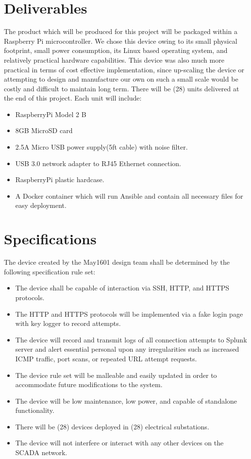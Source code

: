 \section{Deliverables}

The product which will be produced for this project will be packaged within a Raspberry Pi microcontroller. We chose this device owing to its small physical footprint, small power consumption, its Linux based operating system, and relatively practical hardware capabilities. This device was also much more practical in terms of cost effective implementation, since up-scaling the device or attempting to design and manufacture our own on such a small scale would be costly and difficult to maintain long term. There will be (28) units delivered at the end of this project. Each unit will include:

\begin{itemize} 
\item RaspberryPi Model 2 B
\item 8GB MicroSD card
\item 2.5A Micro USB power supply(5ft cable) with noise filter.
\item USB 3.0 network adapter to RJ45 Ethernet connection.
\item RaspberryPi plastic hardcase.
\item A Docker container which will run Ansible and contain all necessary files for easy deployment.
\end{itemize}

\section{Specifications}

The device created by the May1601 design team shall be determined by the following specification rule set:

\begin{itemize} 
\item The device shall be capable of interaction via SSH, HTTP, and HTTPS protocols.
\item The HTTP and HTTPS protocols will be implemented via a fake login page with key logger to record attempts.
\item The device will record and transmit logs of all connection attempts to Splunk server and alert essential personal upon any irregularities such as increased ICMP traffic, port scans, or repeated URL attempt requests. 
\item The device rule set will be malleable and easily updated in order to accommodate future modifications to the system.
\item The device will be low maintenance, low power, and capable of standalone functionality. 
\item There will be (28) devices deployed in (28) electrical substations. 
\item The device will not interfere or interact with any other devices on the SCADA network.
\end{itemize}
